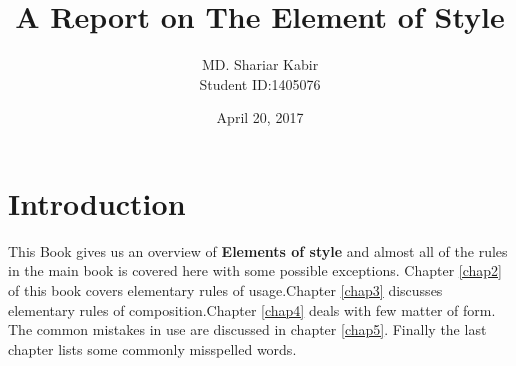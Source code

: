 \documentclass{report}
\begin{document}
\title{A Report on The Element of Style}
\author{MD. Shariar Kabir\\Student ID:1405076}
\date{April 20, 2017}
\maketitle

\tableofcontents{}

\chapter{\color{blue} Introduction}
This Book gives us an overview of \textbf{Elements of style} and almost all of the rules in the main book is covered here with some possible exceptions.
Chapter \ref{chap2} of this book covers elementary rules of usage.Chapter \ref{chap3} discusses elementary rules of composition.Chapter \ref{chap4} deals with few matter of form. The common mistakes in use are discussed in chapter \ref{chap5}. Finally the last chapter lists some commonly misspelled words.  

	
\end{document}
